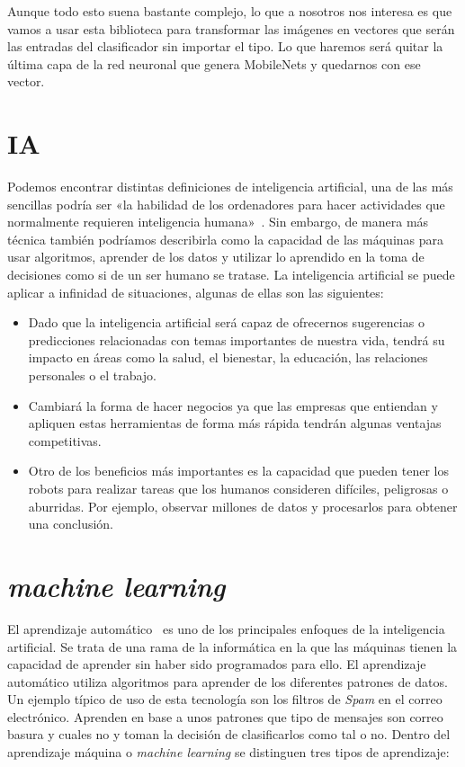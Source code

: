 \documentclass[a4paper, 12pt]{book}
\begin{document}
Aunque todo esto suena bastante complejo, lo que a nosotros nos interesa es que vamos a usar esta biblioteca para transformar las imágenes en vectores que serán las entradas del clasificador sin importar el tipo. Lo que haremos será quitar la última capa de la red neuronal que genera MobileNets y quedarnos con ese vector.

\section{IA} 
\label{sec:inteligenciaartificial}

Podemos encontrar distintas definiciones de inteligencia artificial, una de las más sencillas podría ser «la habilidad de los ordenadores para hacer actividades que normalmente requieren inteligencia humana»~\cite{iayml}. Sin embargo, de manera más técnica también podríamos describirla como la capacidad de las máquinas para usar algoritmos, aprender de los datos y utilizar lo aprendido en la toma de decisiones como si de un ser humano se tratase.
La inteligencia artificial se puede aplicar a infinidad de situaciones, algunas de ellas son las siguientes:

\begin{itemize}
 
	\item Dado que la inteligencia artificial será capaz de ofrecernos sugerencias o predicciones relacionadas con temas importantes de nuestra vida, tendrá su impacto en áreas como la salud, el bienestar, la educación, las relaciones personales o el trabajo.
 
	\item Cambiará la forma de hacer negocios ya que las empresas que entiendan y apliquen estas herramientas de forma más rápida tendrán algunas ventajas competitivas.

	\item Otro de los beneficios más importantes es la capacidad que pueden tener los robots para realizar tareas que los humanos consideren difíciles, peligrosas o aburridas. Por ejemplo, observar millones de datos y procesarlos para obtener una conclusión.

\end{itemize}


\section{\emph{machine learning}} 
\label{sec:machinelearning}

El aprendizaje automático~\cite{iayml} es uno de los principales enfoques de la inteligencia artificial. Se trata de una rama de la informática en la que las máquinas tienen la capacidad de aprender sin haber sido programados para ello. El aprendizaje automático utiliza algoritmos para aprender de los diferentes patrones de datos. Un ejemplo típico de uso de esta tecnología son los filtros de \emph{Spam} en el correo electrónico. Aprenden en base a unos patrones que tipo de mensajes son correo basura y cuales no y toman la decisión de clasificarlos como tal o no. Dentro del aprendizaje máquina o \emph{machine learning} se distinguen tres tipos de aprendizaje:
\end{document}
